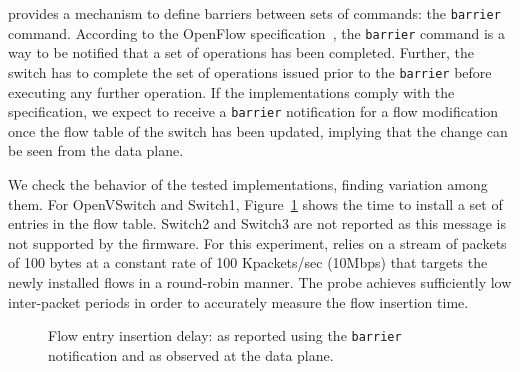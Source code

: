 \of provides a mechanism to define barriers between sets of
commands: the \texttt{barrier} command. According to the OpenFlow
specification~\cite{openflow-spec}, the \texttt{barrier} command is a way to be
notified that a set of \of operations has been completed. Further, 
the switch has to complete the set of operations issued prior to the
\texttt{barrier}
before executing any further operation. If the \of implementations 
comply with the specification, we expect to receive a \texttt{barrier} notification for 
a flow modification once the flow table of the switch has been updated, 
implying that the change can be seen from the data plane.

We check the behavior of the tested \of implementations,
finding variation among them. For OpenVSwitch and Switch1,
Figure~\ref{fig:flow_insertion_comparison} shows the time to install a
set of entries in the flow table. Switch2 and Switch3 
are not reported as this \of message is not supported by the firmware. 
For this experiment, \oflops relies on a stream of packets of 100 bytes at
a constant rate of 100 Kpackets/sec (10Mbps) that targets the newly installed flows in a
round-robin manner. The probe achieves sufficiently low inter-packet
periods in order to accurately measure the flow insertion time.


\begin{figure}[ht]
  \begin{center}
  \end{center}
  \caption{Flow entry insertion delay: as reported using the
    \texttt{barrier} notification and as observed at the data
    plane.}
  \label{fig:flow_insertion_comparison}
\end{figure}


